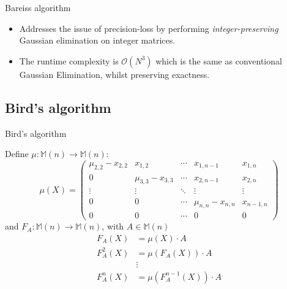 \documentclass{beamer}
\begin{document}
\begin{frame}{Bareiss algorithm}

    \begin{itemize}

        \item Addresses the issue of precision-loss by performing \emph{integer-preserving}
            Gaussian elimination on integer matrices.

        \item The runtime complexity is $\mathcal{O}(N^3)$ which is the same as conventional
            Gaussian Elimination, whilst preserving exactness.


    \end{itemize}


\end{frame}

\subsection{Bird's algorithm}

\begin{frame}{Bird's algorithm}

    Define $\mu : \mathbb{M}(n) \to \mathbb{M}(n)$:
    \[
        \mu(X) =
        \begin{pmatrix}{}
            \mu_{2,2} - x_{2,2} & x_{1,2}             & \cdots & x_{1,n-1}           & x_{1,n} \\
            0                   & \mu_{3,3} - x_{3,3} & \cdots & x_{2,n-1}           & x_{2,n} \\
            \vdots              & \vdots              & \ddots & \vdots              & \vdots \\
            0                   & 0                   & \cdots & \mu_{n,n} - x_{n,n} & x_{n-1,n} \\
            0                   & 0                   & \cdots & 0                   & 0
        \end{pmatrix}
    \]
    and $F_A : \mathbb{M}(n) \to \mathbb{M}(n)$,
    with $A \in \mathbb{M}(n)$
    \begin{align*}{}
        F_A(X)    & = \mu(X)\cdot A \\
        F_A^2(X)  & = \mu(F_A(X)) \cdot A \\
                  & \vdots \\
        F_A^n(X)  & = \mu(F_A^{n-1}(X)) \cdot A \\
    \end{align*}

\end{frame}
\end{document}
